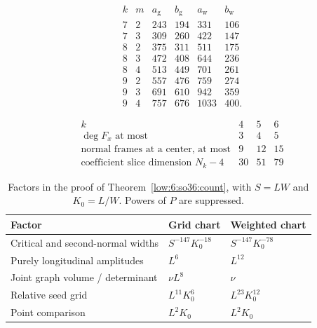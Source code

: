 \documentclass[11pt]{amsart}
\theoremstyle{definition}
\theoremstyle{remark}
\numberwithin{equation}{section}
\newcommand{\partIref}[1]{\hyperref[I:#1]{I.\ref*{I:#1}}}
\begin{document}
\begin{table}[H]
\centering\small
\caption{Raw scalar exponents in the proof of Proposition~\ref{low:9:u9:gauss-tails}, obtained from Proposition~\partIref{surf:gauss-tail}.}\label{app:table-gauss-pairs}
\[
\begin{array}{c|c|rr|rr}
k&m&a_{\mathrm g}&b_{\mathrm g}&a_{\mathrm w}&b_{\mathrm w}\\\hline
7&2&243&194&331&106\\
7&3&309&260&422&147\\
8&2&375&311&511&175\\
8&3&472&408&644&236\\
8&4&513&449&701&261\\
9&2&557&476&759&274\\
9&3&691&610&942&359\\
9&4&757&676&1033&400.
\end{array}
\]
\end{table}

\begin{table}[H]
\centering\small
\caption{Ordinary-surface dimensions and fixed-center normal-frame bounds in Section~\ref{quartic:normalization}.}\label{app:table-normal-frames}
\[
\begin{array}{c|ccc}
k&4&5&6\\ \hline
\deg F_x\text{ at most}&3&4&5\\
\text{normal frames at a center, at most}&9&12&15\\
\text{coefficient slice dimension }N_k-4&30&51&79
\end{array}
\]
\end{table}

\begin{table}[H]
\centering\small
\caption{Factors in the proof of Theorem~\ref{low:6:so36:count}, with $S=LW$ and $K_0=L/W$. Powers of $P$ are suppressed.}\label{app:table-oblique-factors}
\begin{tabular}{lll}
\toprule
Factor & Grid chart & Weighted chart\\
\midrule
Critical and second-normal widths & $S^{-147}K_0^{-18}$ & $S^{-147}K_0^{-78}$\\
Purely longitudinal amplitudes & $L^6$ & $L^{12}$\\
Joint graph volume / determinant & $\nu L^8$ & $\nu$\\
Relative seed grid & $L^{11}K_0^6$ & $L^{23}K_0^{12}$\\
Point comparison & $L^2K_0$ & $L^2K_0$\\
\bottomrule
\end{tabular}
\end{table}
\end{document}
